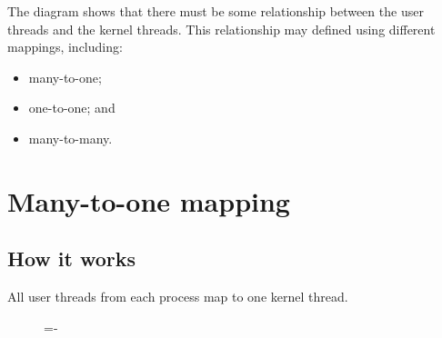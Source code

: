 \documentclass[a4paper]{systems-software}
\begin{document}
The diagram shows that there must be some relationship between the user threads and the kernel threads. This relationship may defined using different mappings, including:
\begin{itemize}
	\item many-to-one;
	\item one-to-one; and
	\item many-to-many.
\end{itemize}


\section*{Many-to-one mapping}

\subsection*{How it works}

All user threads from each process map to one kernel thread.

\begin{figure}[H]
  \lineskip=-\fboxrule
\end{figure}
\end{document}
